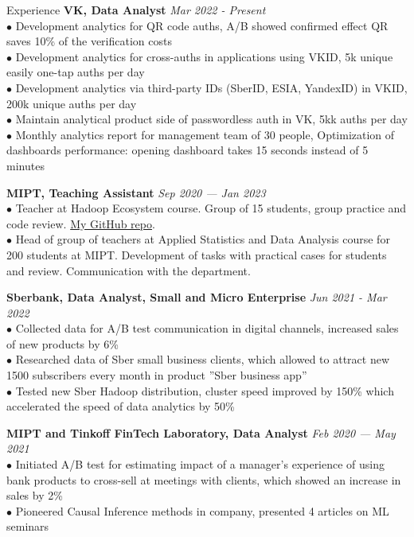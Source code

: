 \documentclass{resume} %
\begin{document}
\begin{rSection}{ Experience }
    { \bf VK, Data Analyst} \hfill {\em Mar 2022 - Present}\\
    { $\bullet$ Development analytics for QR code auths, A/B showed confirmed effect QR saves 10\% of the verification costs} \\
    { $\bullet$ Development analytics for cross-auths in applications using VKID, 5k unique easily one-tap auths per day}\\
    { $\bullet$ Development analytics via third-party IDs (SberID, ESIA, YandexID) in VKID, 200k unique auths per day}\\
    { $\bullet$ Maintain analytical product side of passwordless auth in VK, 5kk auths per day }\\
    { $\bullet$ Monthly analytics report for management team of 30 people, Optimization of dashboards performance: opening dashboard takes 15 seconds instead of 5 minutes}
    
    { \bf MIPT, Teaching Assistant} \hfill {\em Sep 2020 — Jan 2023}\\
    { $\bullet$ Teacher at Hadoop Ecosystem course. Group of 15 students, group practice and code review. \href{https://github.com/YHx07/pd-seminars}{My GitHub repo}.}\\
    { $\bullet$ Head of group of teachers at Applied Statistics and Data Analysis course for 200 students at MIPT. Development of tasks with practical cases for students and review. Communication with the department. }

    { \bf Sberbank, Data Analyst, Small and Micro Enterprise} \hfill {\em Jun 2021 - Mar 2022}\\
    { $\bullet$ Collected data for A/B test communication in digital channels, increased sales of new products by 6\% }\\
    { $\bullet$ Researched data of Sber small business clients, which allowed to attract new 1500 subscribers every month in product ''Sber business app'' }\\
    { $\bullet$ Tested new Sber Hadoop distribution, cluster speed improved by 150\% which accelerated the speed of data analytics by 50\%}
    
    { \bf MIPT and Tinkoff FinTech Laboratory, Data Analyst } \hfill {\em Feb 2020 — May 2021}\\
    { $\bullet$ Initiated A/B test for estimating impact of a manager's experience of using bank products to cross-sell at meetings with clients, which showed an increase in sales by 2\% }\\
    { $\bullet$ Pioneered Causal Inference methods in company, presented 4 articles on ML seminars }

\end{rSection}
\end{document}
